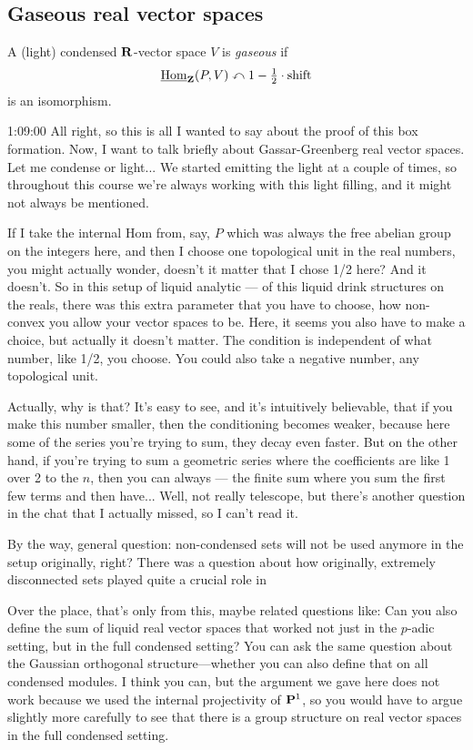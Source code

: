 \subsection{\ufs Gaseous real vector spaces}

\begin{definition}
  A (light) condensed $\R$-vector space $V$ is \emph{gaseous} if
  \[ \ul\Hom_\Z(P, V) \actedonby 1-\tfrac12\cdot\shift \]
  is an isomorphism.
\end{definition}

\begin{unfinished}{1:09:00}
All right, so this is all I wanted to say about the proof of this box formation. Now, I want to talk briefly about Gassar-Greenberg real vector spaces. Let me condense or light... We started emitting the light at a couple of times, so throughout this course we're always working with this light filling, and it might not always be mentioned.

If I take the internal Hom from, say, $P$ which was always the free abelian group on the integers here, and then I choose one topological unit in the real numbers, you might actually wonder, doesn't it matter that I chose 1/2 here? And it doesn't. So in this setup of liquid analytic --- of this liquid drink structures on the reals, there was this extra parameter that you have to choose, how non-convex you allow your vector spaces to be. Here, it seems you also have to make a choice, but actually it doesn't matter. The condition is independent of what number, like 1/2, you choose. You could also take a negative number, any topological unit.

Actually, why is that? It's easy to see, and it's intuitively believable, that if you make this number smaller, then the conditioning becomes weaker, because here some of the series you're trying to sum, they decay even faster. But on the other hand, if you're trying to sum a geometric series where the coefficients are like 1 over 2 to the $n$, then you can always --- the finite sum where you sum the first few terms and then have... Well, not really telescope, but there's another question in the chat that I actually missed, so I can't read it.

By the way, general question: non-condensed sets will not be used anymore in the setup originally, right? There was a question about how originally, extremely disconnected sets played quite a crucial role in

Over the place, that's only from this, maybe related questions like: Can you also define the sum of liquid real vector spaces that worked not just in the $p$-adic setting, but in the full condensed setting? You can ask the same question about the Gaussian orthogonal structure---whether you can also define that on all condensed modules. I think you can, but the argument we gave here does not work because we used the internal projectivity of $\P^1$, so you would have to argue slightly more carefully to see that there is a group structure on real vector spaces in the full condensed setting.


\end{unfinished}
